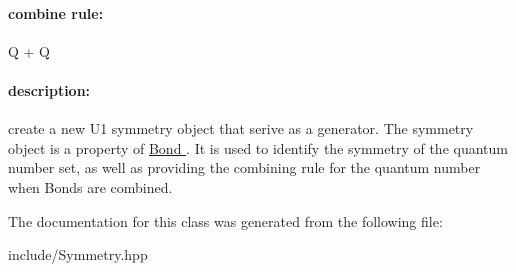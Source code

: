 \paragraph*{combine rule\+:}

\begin{DoxyVerb}Q + Q            
\end{DoxyVerb}


\paragraph*{description\+:}

create a new U1 symmetry object that serive as a generator. The symmetry object is a property of \hyperlink{classcytnx_1_1Bond}{Bond }. It is used to identify the symmetry of the quantum number set, as well as providing the combining rule for the quantum number when Bonds are combined. 

The documentation for this class was generated from the following file\+:\begin{DoxyCompactItemize}
\item 
include/Symmetry.\+hpp\end{DoxyCompactItemize}
